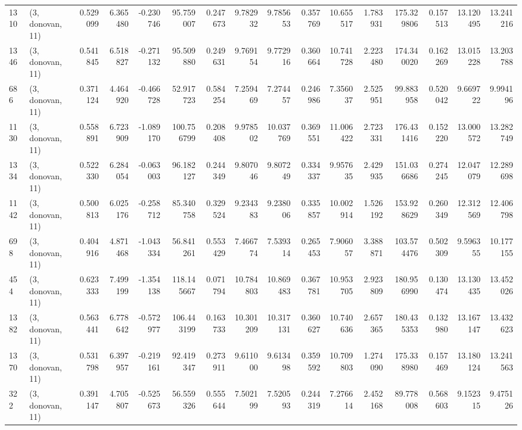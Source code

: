 \begin{tabular}{llrrrrrrrrrrrrrr}
1310 &  (3, donovan, 11) &   0.529099 &   6.365480 &  -0.230746 &     95.759007 &    0.247673 &    9.782932 &    9.785653 &  0.357769 &  10.655517 &   1.783931 &   175.329806 &   0.157513 &  13.120495 &  13.241216 \\
1346 &  (3, donovan, 11) &   0.541845 &   6.518827 &  -0.271132 &     95.509880 &    0.249631 &    9.769154 &    9.772916 &  0.360664 &  10.741728 &   2.223480 &   174.340020 &   0.162269 &  13.015228 &  13.203788 \\
686  &  (3, donovan, 11) &   0.371124 &   4.464920 &  -0.466728 &     52.917723 &    0.584254 &    7.259469 &    7.274457 &  0.246986 &   7.356037 &   2.525951 &    99.883958 &   0.520042 &   9.669722 &   9.994196 \\
1130 &  (3, donovan, 11) &   0.558891 &   6.723909 &  -1.089170 &    100.756799 &    0.208408 &    9.978502 &   10.037769 &  0.369551 &  11.006422 &   2.723331 &   176.431416 &   0.152220 &  13.000572 &  13.282749 \\
1334 &  (3, donovan, 11) &   0.522330 &   6.284054 &  -0.063003 &     96.182127 &    0.244349 &    9.807046 &    9.807249 &  0.334337 &   9.957635 &   2.429935 &   151.036686 &   0.274245 &  12.047079 &  12.289698 \\
1142 &  (3, donovan, 11) &   0.500813 &   6.025176 &  -0.258712 &     85.340758 &    0.329524 &    9.234383 &    9.238006 &  0.335857 &  10.002914 &   1.526192 &   153.928629 &   0.260349 &  12.312569 &  12.406798 \\
698  &  (3, donovan, 11) &   0.404916 &   4.871468 &  -1.043334 &     56.841261 &    0.553429 &    7.466774 &    7.539314 &  0.265453 &   7.906057 &   3.388871 &   103.574476 &   0.502309 &   9.596355 &  10.177155 \\
454  &  (3, donovan, 11) &   0.623333 &   7.499199 &  -1.354138 &    118.145667 &    0.071794 &   10.784803 &   10.869483 &  0.367781 &  10.953705 &   2.923809 &   180.956990 &   0.130474 &  13.130435 &  13.452026 \\
1382 &  (3, donovan, 11) &   0.563441 &   6.778642 &  -0.572977 &    106.443199 &    0.163733 &   10.301209 &   10.317131 &  0.360627 &  10.740636 &   2.657365 &   180.435353 &   0.132980 &  13.167147 &  13.432623 \\
1370 &  (3, donovan, 11) &   0.531798 &   6.397957 &  -0.219161 &     92.419347 &    0.273911 &    9.611000 &    9.613498 &  0.359592 &  10.709803 &   1.274090 &   175.338980 &   0.157469 &  13.180124 &  13.241563 \\
322  &  (3, donovan, 11) &   0.391147 &   4.705807 &  -0.525673 &     56.559326 &    0.555644 &    7.502199 &    7.520593 &  0.244319 &   7.276614 &   2.452168 &    89.778008 &   0.568603 &   9.152315 &   9.475126 \\

\end{tabular}
